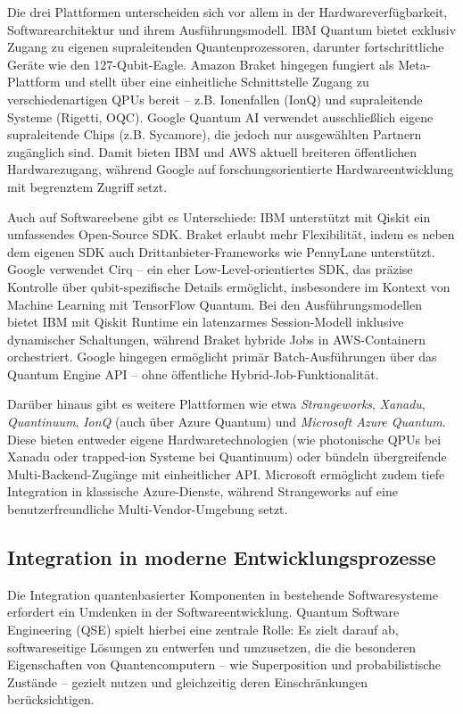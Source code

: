 Die drei Plattformen unterscheiden sich vor allem in der Hardwareverfügbarkeit, Softwarearchitektur und ihrem Ausführungsmodell. IBM Quantum bietet exklusiv Zugang zu eigenen supraleitenden Quantenprozessoren, darunter fortschrittliche Geräte wie den 127-Qubit-Eagle. Amazon Braket hingegen fungiert als Meta-Plattform und stellt über eine einheitliche Schnittstelle Zugang zu verschiedenartigen QPUs bereit – z.B. Ionenfallen (IonQ) und supraleitende Systeme (Rigetti, OQC). Google Quantum AI verwendet ausschließlich eigene supraleitende Chips (z.B. Sycamore), die jedoch nur ausgewählten Partnern zugänglich sind. Damit bieten IBM und AWS aktuell breiteren öffentlichen Hardwarezugang, während Google auf forschungsorientierte Hardwareentwicklung mit begrenztem Zugriff setzt.

Auch auf Softwareebene gibt es Unterschiede: IBM unterstützt mit Qiskit ein umfassendes Open-Source SDK. Braket erlaubt mehr Flexibilität, indem es neben dem eigenen SDK auch Drittanbieter-Frameworks wie PennyLane unterstützt. Google verwendet Cirq – ein eher Low-Level-orientiertes SDK, das präzise Kontrolle über qubit-spezifische Details ermöglicht, insbesondere im Kontext von Machine Learning mit TensorFlow Quantum. Bei den Ausführungsmodellen bietet IBM mit Qiskit Runtime ein latenzarmes Session-Modell inklusive dynamischer Schaltungen, während Braket hybride Jobs in AWS-Containern orchestriert. Google hingegen ermöglicht primär Batch-Ausführungen über das Quantum Engine API – ohne öffentliche Hybrid-Job-Funktionalität. \autocite{googleGoogleQuantumComputing2025} \autocite{mittalQiskitRuntimeCloudNative2022} \autocite{amazonwebservicesAmazonBraketFeatures2025}

Darüber hinaus gibt es weitere Plattformen wie etwa \textit{Strangeworks}, \textit{Xanadu}, \textit{Quantinuum}, \textit{IonQ} (auch über Azure Quantum) und \textit{Microsoft Azure Quantum}. Diese bieten entweder eigene Hardwaretechnologien (wie photonische QPUs bei Xanadu oder trapped-ion Systeme bei Quantinuum) oder bündeln übergreifende Multi-Backend-Zugänge mit einheitlicher API. Microsoft ermöglicht zudem tiefe Integration in klassische Azure-Dienste, während Strangeworks auf eine benutzerfreundliche Multi-Vendor-Umgebung setzt.

\subsection{Integration in moderne Entwicklungsprozesse}

Die Integration quantenbasierter Komponenten in bestehende Softwaresysteme erfordert ein Umdenken in der Softwareentwicklung. Quantum Software Engineering (QSE) spielt hierbei eine zentrale Rolle: Es zielt darauf ab, softwareseitige Lösungen zu entwerfen und umzusetzen, die die besonderen Eigenschaften von Quantencomputern – wie Superposition und probabilistische Zustände – gezielt nutzen und gleichzeitig deren Einschränkungen berücksichtigen.

